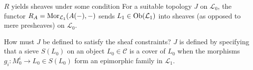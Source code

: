 \begin{frame}
\begin{block}{$R$ yields sheaves under some condition}
For a suitable topology $J$ on $\mathcal{L}_0$, the functor $R_A = \mathop{\rm Mor}\nolimits_{\mathcal{L}_1}(A(-),-)$ sends $L_1 \in \mathop{\rm Ob}\nolimits(\mathcal{L}_1)$ into sheaves (as opposed to mere presheaves) on $\mathcal{L}_0$. 
\end{block}
\begin{block}{How must $J$ be defined to satisfy the sheaf constraints?}
$J$ is defined by specifying that a sieve $S(L_0)$ on an object $L_0 \in \mathcal{C}$ is a cover of $L_0$ when the morphisms $g_i : M_0^i \rightarrow L_0 \in S(L_0)$ form an epimorphic family in $\mathcal{L}_1$.
\end{block}
\end{frame}